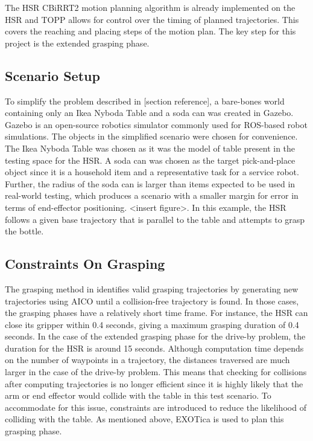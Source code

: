 \documentclass[12pt]{article}
\begin{document}
            The HSR CBiRRT2 motion planning algorithm is already implemented on the HSR and TOPP allows for control over the timing of planned trajectories. This covers the reaching and placing steps of the motion plan. The key step for this project is the extended grasping phase.

        \subsection{Scenario Setup}
            To simplify the problem described in [section reference], a bare-bones world containing only an Ikea Nyboda Table and a soda can was created in Gazebo. Gazebo is an open-source robotics simulator commonly used for ROS-based robot simulations. The objects in the simplified scenario were chosen for convenience. The Ikea Nyboda Table was chosen as it was the model of table present in the testing space for the HSR. A soda can was chosen as the target pick-and-place object since it is a household item and a representative task for a service robot. Further, the radius of the soda can is larger than items expected to be used in real-world testing, which produces a scenario with a smaller margin for error in terms of end-effector positioning. <insert figure>. In this example, the HSR follows a given base trajectory that is parallel to the table and attempts to grasp the bottle.
            
        \subsection{Constraints On Grasping}
            The grasping method in \cite{yang_planning_2018} identifies valid grasping trajectories by generating new trajectories using AICO until a collision-free trajectory is found. In those cases, the grasping phases have a relatively short time frame. For instance, the HSR can close its gripper within 0.4 seconds, giving a maximum grasping duration of 0.4 seconds. In the case of the extended grasping phase for the drive-by problem, the duration for the HSR is around 15 seconds. Although computation time depends on the number of waypoints in a trajectory, the distances traversed are much larger in the case of the drive-by problem. This means that checking for collisions after computing trajectories is no longer efficient since it is highly likely that the arm or end effector would collide with the table in this test scenario. To accommodate for this issue, constraints are introduced to reduce the likelihood of colliding with the table. As mentioned above, EXOTica is used to plan this grasping phase.
\end{document}
